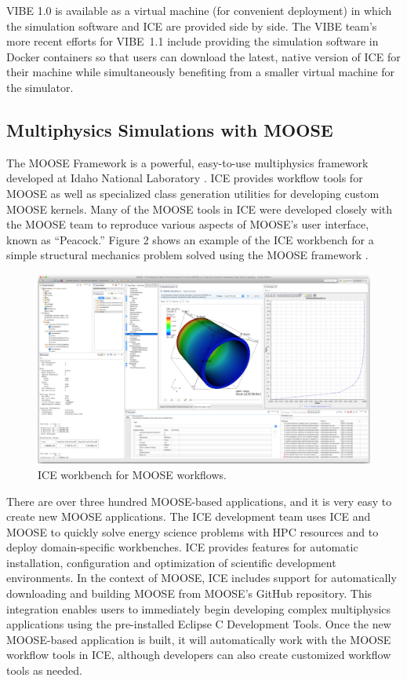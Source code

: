 VIBE 1.0 is available as a virtual machine (for convenient deployment) in which the simulation
software and ICE are provided side by side. The VIBE team's more recent 
efforts for VIBE~1.1 include providing the simulation
software in Docker containers so that users can download the latest,
native version of ICE for their machine while simultaneously benefiting
from a smaller virtual machine for the simulator.

\subsection{Multiphysics Simulations with
MOOSE}\label{multiphysics-simulations-with-moose}

The MOOSE Framework is a powerful, easy-to-use multiphysics framework
developed at Idaho National Laboratory \cite{gaston_moose:_2009}. ICE
provides workflow tools for MOOSE as well as specialized class
generation utilities for developing custom MOOSE kernels. Many of the
MOOSE tools in ICE were developed closely with the MOOSE team to
reproduce various aspects of MOOSE's user interface, known as ``Peacock.'' 
Figure 2 shows an example of the ICE workbench for a simple structural mechanics
problem solved using the MOOSE framework \cite{mccaskey_scientific_2015}.

\begin{figure}[htbp]
\centering
\includegraphics[width=\textwidth]{images/ice-moose.png}
\caption{ICE workbench for MOOSE workflows.}
\end{figure}

There are over three hundred MOOSE-based applications, and it is very
easy to create new MOOSE applications. The ICE development team uses ICE
and MOOSE to quickly solve energy science problems with HPC resources 
and to deploy domain-specific workbenches. ICE provides features for automatic installation, configuration and optimization of scientific development environments. In the context of MOOSE, ICE includes support for automatically downloading and building MOOSE from MOOSE's GitHub
repository. This integration enables users to immediately begin developing
complex multiphysics applications using the pre-installed Eclipse C Development 
Tools. Once the new MOOSE-based application is built, it will automatically work with
the MOOSE workflow tools in ICE, although developers can also create
customized workflow tools as needed.

